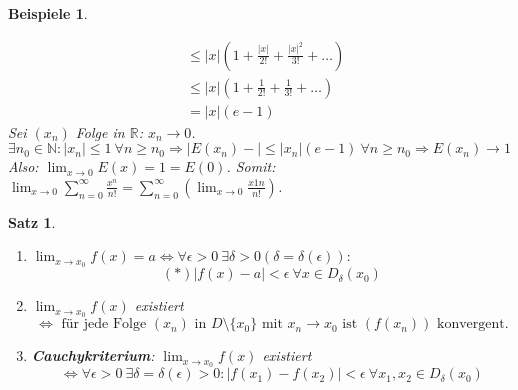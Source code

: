 \documentclass[14pt,titlepage,ngerman,a4paper,headsepline,DIV15,halfparskip*]{scrartcl}
\newcommand{\N}{\mathbb{N}}
\newcommand{\R}{\mathbb{R}}
\theoremstyle{named}
\theoremstyle{dotless}
\newtheorem{satz}[namedtheorem]{Satz}
\newtheorem*{beispiele}{Beispiele}
\begin{document}
\begin{beispiele}
\begin{enumerate}
\begin{align*}
				& \leq |x| \left( 1 + \frac{|x|}{2!} + \frac{|x|^{2}}{3!} + \dotsc \right) \\
				& \leq |x| \left( 1 + \frac{1}{2!} + \frac{1}{3!} + \dotsc \right) \\
				& = |x| ( e - 1 )
			\end{align*}
			Sei $(x_{n})$ Folge in $\R$: $x_{n} \rightarrow 0$. $\exists n_{0} \in \N: |x_{n}| \leq 1 ~\forall n \geq n_{0} \Rightarrow |E(x_{n}) - | \leq |x_{n}|(e-1) ~\forall n \geq n_{0} \Rightarrow E(x_{n}) \rightarrow 1$ \\
			Also: $\lim_{x \rightarrow 0} E(x) = 1 = E(0)$. Somit: $\lim_{x \rightarrow 0} \sum_{n=0}^{\infty} \frac{x^{n}}{n!} = \sum_{n=0}^{\infty} \left( \lim_{x \rightarrow 0} \frac{x1{n}}{n!} \right)$.
	\end{enumerate}	
\end{beispiele}

\begin{satz} \label{6.2:satz} ~\
	\begin{enumerate}
		\item $\lim_{x \rightarrow x_{0}} f(x) = a \iff \forall \epsilon > 0 ~\exists \delta > 0 (\delta = \delta(\epsilon)):$
			$$ (*) |f(x)- a| < \epsilon ~\forall x \in D_{\delta}(x_{0}) $$ \label{6.2.a:satz}
		\item $\lim_{x \rightarrow x_{0}} f(x)$ existiert
			$$ \iff \text{ für jede Folge } (x_{n}) \text{ in } D \setminus \{ x_{0} \} \text{ mit } x_{n} \rightarrow x_{0} \text{ ist } (f(x_{n})) \text{ konvergent}. $$ \label{6.2.b:satz} 
		\item \textbf{Cauchykriterium}: $\lim_{x \rightarrow x_{0}} f(x)$ existiert
			$$ \iff \forall \epsilon > 0 ~\exists \delta = \delta(\epsilon) > 0 : |f(x_{1}) - f(x_{2})| < \epsilon ~\forall x_{1}, x_{2} \in D_{\delta}(x_{0}) $$ \label{6.2.c:satz}
	\end{enumerate}
\end{satz}
\end{document}
